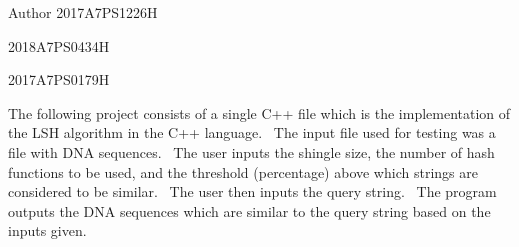\begin{DoxyAuthor}{Author}
2017A7\+P\+S1226H 

2018A7\+P\+S0434H 

2017A7\+P\+S0179H
\end{DoxyAuthor}
The following project consists of a single C++ file which is the implementation of the L\+SH algorithm in the C++ language.~\newline
 The input file used for testing was a file with D\+NA sequences.~\newline
 The user inputs the shingle size, the number of hash functions to be used, and the threshold (percentage) above which strings are considered to be similar.~\newline
 The user then inputs the query string.~\newline
 The program outputs the D\+NA sequences which are similar to the query string based on the inputs given.~\newline
 